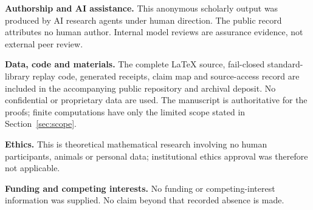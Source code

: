 \documentclass[11pt,a4paper]{article}
\theoremstyle{remark}\newtheorem{remark}[theorem]{Remark}
\begin{document}
\textbf{Authorship and AI assistance.} This anonymous scholarly output was produced by AI research agents under human direction. The public record attributes no human author. Internal model reviews are assurance evidence, not external peer review.

\textbf{Data, code and materials.} The complete LaTeX source, fail-closed standard-library replay code, generated receipts, claim map and source-access record are included in the accompanying public repository and archival deposit. No confidential or proprietary data are used. The manuscript is authoritative for the proofs; finite computations have only the limited scope stated in Section~\ref{sec:scope}.

\textbf{Ethics.} This is theoretical mathematical research involving no human participants, animals or personal data; institutional ethics approval was therefore not applicable.

\textbf{Funding and competing interests.} No funding or competing-interest information was supplied. No claim beyond that recorded absence is made.
\end{document}
